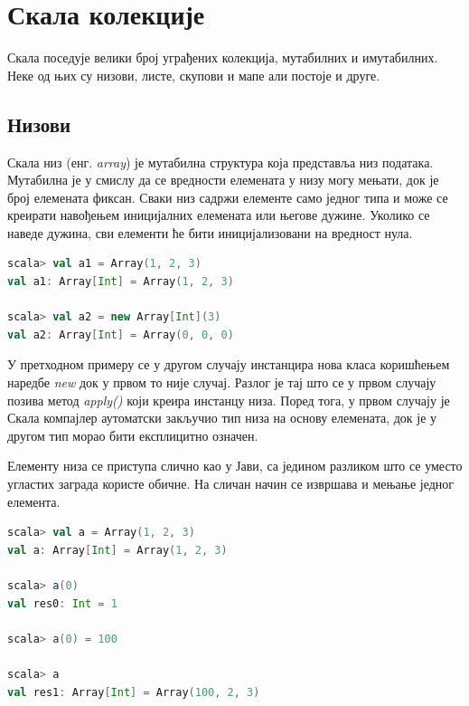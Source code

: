 \documentclass[12pt,oneside]{memoir}
\begin{document}
\section{Скала колекције}
\label{sec:scala_coll}

Скала поседује велики број уграђених колекција, мутабилних и имутабилних. Неке од њих су низови, листе, скупови и мапе али постоје и друге.

\subsection{Низови}
\label{subsec:scala_arrays}

Скала низ (енг. \textit{array}) је мутабилна структура која представља низ података. Мутабилна је у смислу да се вредности елемената у низу могу мењати, док је број елемената фиксан. Сваки низ садржи елементе само једног типа и може се креирати навођењем иницијалних елемената или његове дужине. Уколико се наведе дужина, сви елементи ће бити иницијализовани на вредност нула. \cite{scala_prog}

\begin{lstlisting}[language=Scala, caption={Инстанцирање низа у Скали}, label={lst:scala_coll_array_example}]
scala> val a1 = Array(1, 2, 3)
val a1: Array[Int] = Array(1, 2, 3)

scala> val a2 = new Array[Int](3)
val a2: Array[Int] = Array(0, 0, 0)
\end{lstlisting}

У претходном примеру се у другом случају инстанцира нова класа коришћењем наредбе \textit{new} док у првом то није случај. Разлог је тај што се у првом случају позива метод \textit{apply()} који креира инстанцу низа. Поред тога, у првом случају је Скала компајлер аутоматски закључио тип низа на основу елемената, док је у другом тип морао бити експлицитно означен. \cite{scala_prog}

Елементу низа се приступа слично као у Јави, са једином разликом што се уместо угластих заграда користе обичне. На сличан начин се извршава и мењање једног елемента.

\begin{lstlisting}[language=Scala, caption={Приступ и измена елемента}, label={lst:scala_coll_array_get_set}]
scala> val a = Array(1, 2, 3)
val a: Array[Int] = Array(1, 2, 3)

scala> a(0)
val res0: Int = 1

scala> a(0) = 100

scala> a
val res1: Array[Int] = Array(100, 2, 3)
\end{lstlisting}
\end{document}
